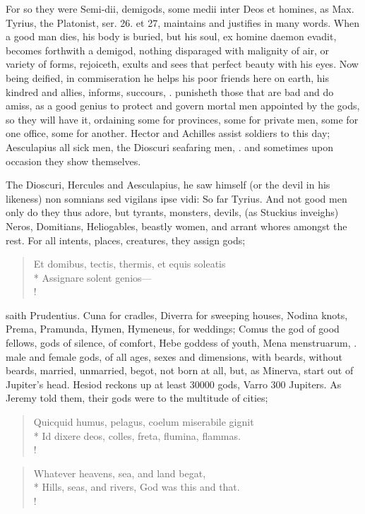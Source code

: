 {For so they were Semi-dii, demigods, some medii inter Deos et homines,
as Max. Tyrius, the Platonist, ser. 26. et 27, maintains and
justifies in many words. When a good man dies, his body is buried, but
his soul, ex homine daemon evadit, becomes forthwith a demigod, nothing
disparaged with malignity of air, or variety of forms, rejoiceth,
exults and sees that perfect beauty with his eyes. Now being deified,
in commiseration he helps his poor friends here on earth, his kindred
and allies, informs, succours, \etc{}. punisheth those that are bad and do
amiss, as a good genius to protect and govern mortal men appointed by
the gods, so they will have it, ordaining some for provinces, some for
private men, some for one office, some for another. Hector and Achilles
assist soldiers to this day; Aesculapius all sick men, the Dioscuri
seafaring men, \etc{}. and sometimes upon occasion they show themselves.

The Dioscuri, Hercules and Aesculapius, he saw himself (or the devil in
his likeness) non somnians sed vigilans ipse vidi: So far Tyrius. And
not good men only do they thus adore, but tyrants, monsters, devils,
(as  Stuckius inveighs) Neros, Domitians, Heliogables, beastly
women, and arrant whores amongst the rest. For all intents, places,
creatures, they assign gods;

\begin{latin}
\begin{verse}%
Et domibus, tectis, thermis, et equis soleatis\\*
Assignare solent genios---\\!
\end{verse}%
\end{latin}

saith Prudentius. Cuna for cradles, Diverra for sweeping houses, Nodina
knots, Prema, Pramunda, Hymen, Hymeneus, for weddings; Comus the god of
good fellows, gods of silence, of comfort, Hebe goddess of youth, Mena
menstruarum, \etc{}. male and female gods, of all ages, sexes and
dimensions, with beards, without beards, married, unmarried, begot, not
born at all, but, as Minerva, start out of Jupiter's head. Hesiod
reckons up at least 30\thinspace{}000 gods, Varro 300 Jupiters. As Jeremy told
them, their gods were to the multitude of cities;

\begin{latin}
\begin{verse}%
Quicquid humus, pelagus, coelum miserabile gignit\\*
Id dixere deos, colles, freta, flumina, flammas.\\!
\end{verse}%
\end{latin}
\translationrule%
\begin{verse}%
Whatever heavens, sea, and land begat,\\*
Hills, seas, and rivers, God was this and that.\\!
\end{verse}%

}
